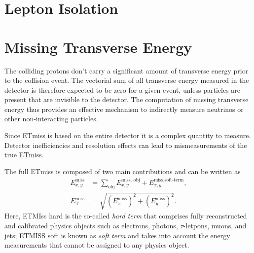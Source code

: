 
\section{Lepton Isolation}



\section{Missing Transverse Energy}
\cite{PERF-2016-07}

The colliding protons don't carry a significant amount of transverse energy prior to the collision event.
The vectorial sum of all transverse energy measured in the detector is therefore expected to be zero for a given event, unless particles are present that are invisible to the detector. The computation of missing transverse energy thus provides an effective mechanism to indirectly measure neutrinos or other non-interacting particles.

Since ETmiss is based on the entire detector it is a complex quantity to measure.
Detector inefficiencies and resolution effects can lead to mismeasurements of the true ETmiss.

The full ETmiss is composed of two main contributions and can be written as
\begin{align}
    E_{x,y}^\text{miss}      & = \sum_{\text{obj}} E_{x,y}^\text{miss, obj} + E_{x,y}^\text{miss,soft-term},       \\
    E_{\text{T}}^\text{miss} & = \sqrt{ \left( E_x^{\text{miss}} \right)^2 + \left(  E_y^{\text{miss}}\right)^2 }.
    \label{eq:met}
\end{align}
Here, ETMIss hard is the so-called \emph{hard term} that comprises fully reconstructed and calibrated physics objects such as electrons, photons, $\tau$-letpons, muons, and jets; ETMISS soft is known as \emph{soft term} and takes into account the energy measurements that cannot be assigned to any physics object.

